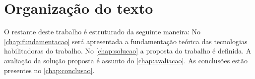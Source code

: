 \section{Organização do texto}

O restante deste trabalho é estruturado da seguinte maneira: No \autoref{chap:fundamentacao} será apresentada a fundamentação teórica das tecnologias habilitadoras do trabalho. No \autoref{chap:solucao} a proposta do trabalho é definida. A avaliação da solução proposta é assunto do \autoref{chap:avaliacao}. As conclusões estão presentes no \autoref{chap:conclusao}.

